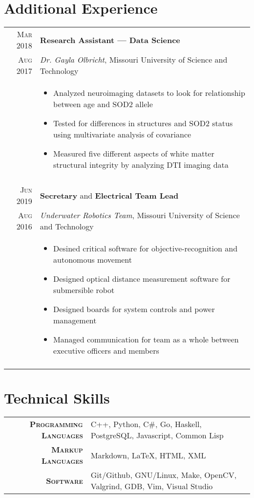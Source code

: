 \documentclass[a4paper,10pt]{article}
\newcommand{\br}{\\\multicolumn{2}{c}{}}
\begin{document}
\section{Additional Experience}
\begin{tabular}{r|p{15cm}}
    \textsc{Mar 2018} & \textbf{Research Assistant --- Data Science} \\
    \textsc{Aug 2017} & \textit{Dr. Gayla Olbricht}, Missouri University of Science and Technology \\ &
    \begin{itemize}
    \item Analyzed neuroimaging datasets to look for relationship between age and SOD2 allele
    \item Tested for differences in structures and SOD2 status using multivariate analysis of covariance
    \item Measured five different aspects of white matter structural integrity by analyzing DTI imaging data
    \end{itemize} \br\\

    \textsc{Jun 2019} & \textbf{Secretary} and \textbf{Electrical Team Lead} \\
    \textsc{Aug 2016} & \textit{Underwater Robotics Team}, Missouri University of Science and Technology \\ &
    \begin{itemize}
    \item Desined critical software for objective-recognition and autonomous movement
    \item Designed optical distance measurement software for submersible robot
    \item Designed boards for system controls and power management
    \item Managed communication for team as a whole between executive officers and members
    \end{itemize} \br\\

\end{tabular}

\section{Technical Skills}
\begin{tabular}{r|p{15cm}}
    \textsc{\small \textbf {Programming Languages}} &
    C++,
    Python,
    C\#,
    Go,
    Haskell,
    PostgreSQL,
    Javascript,
    Common Lisp\\

    \textsc{\small \textbf {Markup Languages}} &
    Markdown,
    \LaTeX,
    HTML,
    XML\\

    \textsc{\small \textbf {Software}} &
    Git/Github,
    GNU/Linux,
    Make,
    OpenCV,
    Valgrind,
    GDB,
    Vim,
    Visual Studio
\end{tabular}
\end{document}
